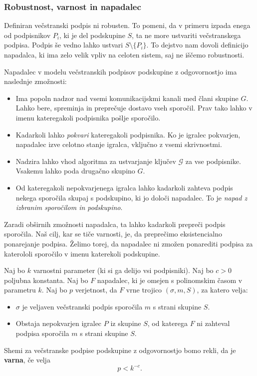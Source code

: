 \documentclass[isrm2, tisk]{fmfdelo}
\begin{document}
\subsubsection{Robustnost, varnost in napadalec}
Definiran večstranski podpis ni robusten. To pomeni, da v primeru izpada enega od podpisnikov $P_i$, 
ki je del podskupine $S$, ta ne more ustvariti večstranskega podpisa. Podpis še vedno lahko ustvari 
$S \setminus \{P_i\}$. To dejstvo nam dovoli definicijo napadalca, ki ima zelo velik vpliv na celoten 
sistem, saj ne iščemo robustnosti. 

\begin{definicija}
\label{def:asm-napadalec}
    Napadalec v modelu večstranskih podpisov podskupine z odgovornostjo ima naslednje zmožnosti:
    \begin{itemize}
        \item Ima popoln nadzor nad vsemi komunikacijskmi kanali med člani skupine $G$. Lahko bere, 
            spreminja in preprečuje dostavo vseh sporočil. Prav tako lahko v imenu kateregakoli 
            podpisnika pošlje sporočilo.
        \item Kadarkoli lahko \textit{pokvari} kateregakoli podpisnika. Ko je igralec pokvarjen, 
            napadalec izve celotno stanje igralca, vključno z vsemi skrivnostmi.
        \item Nadzira lahko vhod algoritma za ustvarjanje ključev $\mathcal{G}$ za vse podpisnike. 
            Vsakemu lahko poda drugačno skupino $G$.
        \item Od kateregakoli nepokvarjenega igralca lahko kadarkoli zahteva podpis nekega sporočila 
            skupaj s podskupino, ki jo določi napadalec. To je \textit{napad z izbranim sporočilom 
            in podskupino}.
    \end{itemize}
\end{definicija}

Zaradi obširnih zmožnosti napadalca, ta lahko kadarkoli prepreči podpis sporočila. Naš cilj, kar se 
tiče varnosti, je, da preprečimo eksistencialno ponarejanje podpisa. Želimo torej, da napadalec ni 
zmožen ponarediti podpisa za katerololi sporočilo v imenu katerekoli podskupine.

\begin{definicija}
\label{def:asm-varnost}
    Naj bo $k$ varnostni parameter (ki si ga delijo vsi podpisniki). Naj bo $c > 0$ poljubna konstanta. 
    Naj bo $F$ napadalec, ki je omejen s polinomskim časom v parametru $k$. Naj bo $p$ verjetnost, da 
    $F$ vrne trojico $(\sigma, m, S)$, za katero velja: 
    \begin{itemize}
        \item $\sigma$ je veljaven večstranski podpis sporočila $m$ s strani skupine $S$.
        \item Obstaja nepokvarjen igralec $P$ iz skupine $S$, od katerega $F$ ni zahteval podpisa 
            sporočila $m$ s strani skupine $S$.
    \end{itemize}
    Shemi za večstranske 
    podpise podskupine z odgovornostjo bomo rekli, da je \textbf{varna}, če velja 
    $$ 
    p < k^{-c}.
    $$
\end{definicija}
\end{document}
